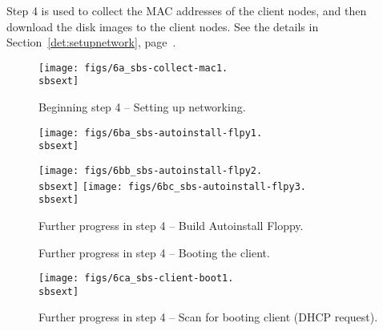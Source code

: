 Step 4 is used to collect the MAC addresses of the client nodes, and
then download the disk images to the client nodes.  See the details in
Section~\ref{det:setupnetwork}, page~\pageref{det:setupnetwork}.

\begin{figure}[h!]
  \begin{center}
    \centerline{\texttt{[image: figs/6a\_sbs-collect-mac1.\\sbsext]}}
    \caption{Beginning step 4 -- Setting up networking.}
    \label{fig:sbs-setup-network1}
  \end{center}
\end{figure}


\begin{figure}[h!]
  \begin{center}
    \centerline{\texttt{[image: figs/6ba\_sbs-autoinstall-flpy1.\\sbsext]}}
    \vspace{\imgvskip}
    \centerline{
      \texttt{[image: figs/6bb\_sbs-autoinstall-flpy2.\\sbsext]}
      \hspace{\imghskip}
      \texttt{[image: figs/6bc\_sbs-autoinstall-flpy3.\\sbsext]}
      }
    \caption{Further progress in step 4 -- Build Autoinstall Floppy.}
    \label{fig:sbs-autoinstall-flpy1}
  \end{center}
\end{figure}


\begin{figure}[h!]
  \begin{center}
    \centerline{
      }
    \caption{Further progress in step 4 -- Booting the client.}
    \label{fig:sbs-collect-boot1}
  \end{center}
\end{figure}

\begin{figure}[h!]
  \begin{center}
    \centerline{
      \texttt{[image: figs/6ca\_sbs-client-boot1.\\sbsext]}}
    \caption{Further progress in step 4 -- Scan for booting client (DHCP
      request).}
    \label{fig:sbs-client-boot2}
  \end{center}
\end{figure}

